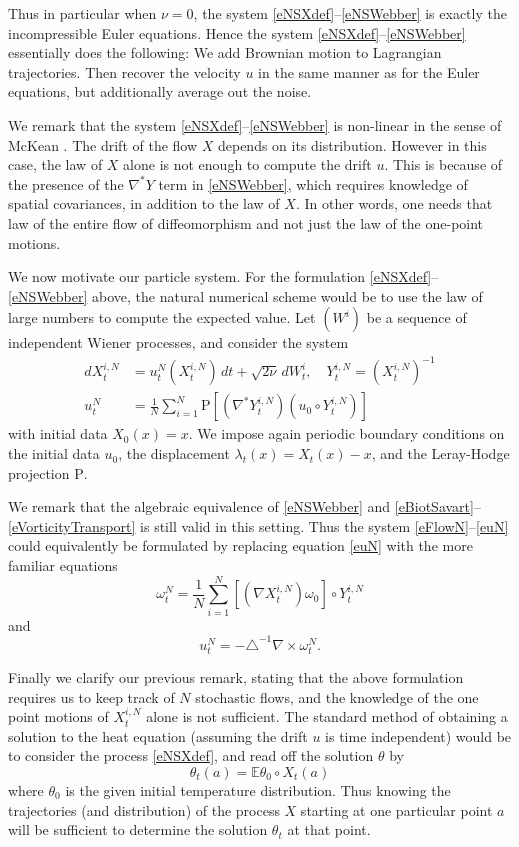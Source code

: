 \documentclass[final]{amsart}%
\newcommand{\slns}{\eqref{eNSXdef}--\eqref{eNSWebber}\xspace}
\newcommand{\mceuler}{\eqref{eFlowN}--\eqref{euN}\xspace}
\newcommand{\lap}{\triangle}
\newcommand{\inv}{^{-1}}
\newcommand{\transpose}{^*}
\newcommand{\grad}{\nabla}
\newcommand{\gradt}{\grad\transpose}
\newcommand{\curl}{\grad \times}
\newcommand{\E}{\mathbb{E}}
\newcommand{\lhp}{\boldsymbol{\mathrm{P}}}
\numberwithin{equation}{section}
\theoremstyle{definition}
\theoremstyle{remark}
\begin{document}
Thus in particular when $\nu = 0$, the system \slns is exactly the
incompressible Euler equations. Hence the system \slns essentially
does the following: We add Brownian motion to Lagrangian
trajectories. Then recover the velocity $u$ in the same manner as for
the Euler equations, but additionally average out the noise.

We remark that the system \slns is non-linear in the sense of McKean
\cite{bibSznitman}. The drift of the flow $X$ depends on its
distribution. However in this case, the law of $X$ alone is not enough
to compute the drift $u$. This is because of the presence of the
$\gradt Y$ term in \eqref{eNSWebber}, which requires knowledge of
spatial covariances, in addition to the law of $X$. In other words,
one needs that law of the entire flow of diffeomorphism and not just
the law of the one-point motions.  \medskip

We now motivate our particle system. For the formulation \slns above,
the natural numerical scheme would be to use the law of large numbers
to compute the expected value. Let $(W^i)$ be a sequence of
independent Wiener processes, and consider the system
\begin{align}
  \label{eFlowN} dX^{i,N}_t &= u^N_t \left( X^{i,N}_t \right) \, dt + \sqrt{2\nu}\,dW^i_t,\quad  Y^{i,N}_t = \left( X^{i,N}_t \right)\inv\\
\label{euN} u^N_t &= \frac{1}{N} \sum_{i=1}^N \lhp\left[ (\gradt Y^{i,N}_t) (u_0 \circ Y^{i,N}_t) \right]
\end{align}
with initial data $X_0(x) = x$. We impose again periodic boundary
conditions on the initial data $u_0$, the displacement $\lambda_t(x) =
X_t(x) - x$, and the Leray-Hodge projection $\lhp$.

We remark that the algebraic equivalence of \eqref{eNSWebber} and
\eqref{eBiotSavart}--\eqref{eVorticityTransport} is still valid in
this setting. Thus the system \mceuler could equivalently be
formulated by replacing equation \eqref{euN} with the more familiar
equations
\begin{equation}
\label{eOmegaN} \omega_t^N = \frac{1}{N} \sum_{i = 1}^N \left[ (\grad X^{i,N}_t) \omega_0\right] \circ Y^{i,N}_t
\end{equation}
and
\begin{equation}
  \label{eBiotSavartN} u^N_t = - \lap\inv \curl \omega^N_t.
\end{equation}

Finally we clarify our previous remark, stating that the above formulation requires us to keep track of $N$ stochastic flows, and the knowledge of the one point motions of $X^{i,N}_t$ alone is not sufficient. The standard method of obtaining a solution to the heat equation (assuming the drift $u$ is time independent) would be to consider the process \eqref{eNSXdef}, and read off the solution $\theta$ by
\begin{equation*}
\theta_t(a) = \E \theta_0 \circ X_t(a)
\end{equation*}
where $\theta_0$ is the given initial temperature distribution.
Thus knowing the trajectories (and distribution) of the process $X$ starting at one particular point $a$ will be sufficient to determine the solution $\theta_t$ at that point.
\end{document}
